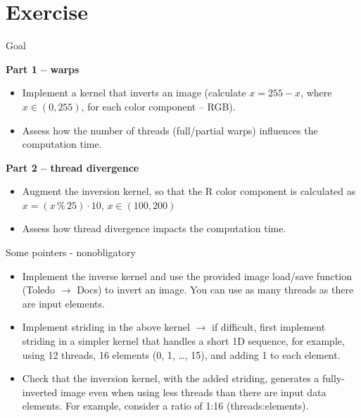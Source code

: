 \documentclass[11pt,t]{beamer}
\begin{document}
\section{Exercise}

\begin{frame}{Goal}

    \textbf{Part 1 -- warps}
    \begin{itemize}\setlength\itemsep{0.5em}\vspace{1mm}
        \item Implement a kernel that inverts an image (calculate $x = 255 - x$, where $x \in (0, 255)$, for each color component -- RGB).
        \item Assess how the number of threads (full/partial warps) influences the computation time.
    \end{itemize}

    \vspace{4mm}

    \textbf{Part 2 -- thread divergence}
    \begin{itemize}\setlength\itemsep{0.5em}\vspace{1mm}
        \item Augment the inversion kernel, so that the R color component is calculated as $x = (x \, \% \, 25) \cdot 10$, $x \in (100, 200)$
        \item Assess how thread divergence impacts the computation time.
    \end{itemize}

    
\end{frame}


\begin{frame}{Some pointers - nonobligatory}

\begin{itemize}\setlength\itemsep{1em}
    \item Implement the inverse kernel and use the provided image load/save function (Toledo $\rightarrow$ Docs) to invert an image. You can use as many threads as there are input elements.
    \item Implement striding in the above kernel $\rightarrow$ if difficult, first implement striding in a simpler kernel that handles a short 1D sequence, for example, using 12 threads, 16 elements (0, 1, \dots, 15), and adding 1 to each element.
    \item Check that the inversion kernel, with the added striding, generates a fully-inverted image even when using less threads than there are input data elements. For example, consider a ratio of 1:16 (threads:elements).
\end{itemize}
    
\end{frame}
\end{document}
